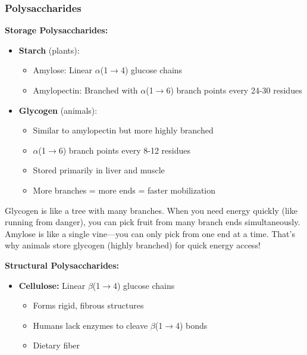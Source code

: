 \subsubsection{Polysaccharides}

\textbf{Storage Polysaccharides:}

\begin{itemize}
    \item \textbf{Starch} (plants):
    \begin{itemize}
        \item Amylose: Linear $\alpha$(1$\rightarrow$4) glucose chains
        \item Amylopectin: Branched with $\alpha$(1$\rightarrow$6) branch points every 24-30 residues
    \end{itemize}
    
    \item \textbf{Glycogen} (animals):
    \begin{itemize}
        \item Similar to amylopectin but more highly branched
        \item $\alpha$(1$\rightarrow$6) branch points every 8-12 residues
        \item Stored primarily in liver and muscle
        \item More branches = more ends = faster mobilization
    \end{itemize}
\end{itemize}

\begin{analogy}
Glycogen is like a tree with many branches. When you need energy quickly (like running from danger), you can pick fruit from many branch ends simultaneously. Amylose is like a single vine—you can only pick from one end at a time. That's why animals store glycogen (highly branched) for quick energy access!
\end{analogy}

\textbf{Structural Polysaccharides:}

\begin{itemize}
    \item \textbf{Cellulose:} Linear $\beta$(1$\rightarrow$4) glucose chains
    \begin{itemize}
        \item Forms rigid, fibrous structures
        \item Humans lack enzymes to cleave $\beta$(1$\rightarrow$4) bonds
        \item Dietary fiber
    \end{itemize}
\end{itemize}


